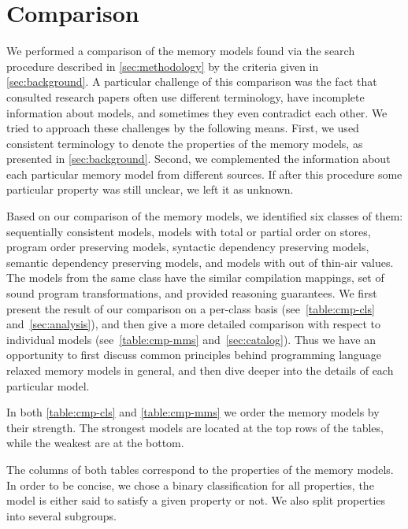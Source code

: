 \section{Comparison}
\label{sec:comparison}

We performed a comparison of the memory models 
found via the search procedure described in \cref{sec:methodology} 
by the criteria given in \cref{sec:background}. 
A particular challenge of this comparison was the fact that 
consulted research papers often use different terminology, 
have incomplete information about models, and 
sometimes they even contradict each other. 
We tried to approach these challenges by the following means.
First, we used consistent terminology 
to denote the properties of the memory models, 
as presented in \cref{sec:background}.
Second, we complemented the information about 
each particular memory model from different sources.
If after this procedure some particular property 
was still unclear, we left it as unknown. 

Based on our comparison of the memory models, 
we identified six classes of them:
sequentially consistent models,
models with total or partial order on stores,
program order preserving models, 
syntactic dependency preserving models, 
semantic dependency preserving models, 
and models with out of thin-air values. 
The models from the same class have the similar compilation mappings, 
set of sound program transformations, and provided reasoning guarantees.
We first present the result of our comparison on a per-class basis 
(see~\cref{table:cmp-cls} and~\cref{sec:analysis}), and 
then give a more detailed comparison with respect to individual models
(see~\cref{table:cmp-mms} and~\cref{sec:catalog}).
Thus we have an opportunity to first discuss common principles
behind programming language relaxed memory models in general, 
and then dive deeper into the details of each particular model. 



In both \cref{table:cmp-cls} and \cref{table:cmp-mms} we order
the memory models by their strength.  
The strongest models are located at the top rows of the tables, 
while the weakest are at the bottom.  

The columns of both tables correspond 
to the properties of the memory models.
In order to be concise, we chose a binary classification for all properties,
\ie the model is either said to satisfy a given property or not.  
We also split properties into several subgroups.

